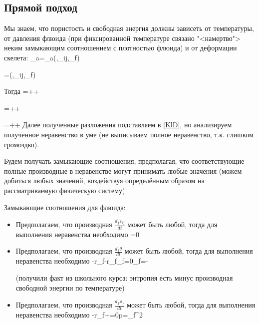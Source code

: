 \documentclass[main.tex]{subfiles}
\begin{document}
\subsection{Прямой подход}

Мы знаем, что пористость и свободная энергия должны зависеть от температуры, от давления флюида (при фиксированной температуре связано "<намертво"> неким замыкающим соотношением с плотностью флюида) и от деформации скелета:
\beq
\Psi_a=\Psi_a\left(\theta,\varepsilon_{ij},\rho_f\right)
\eeq

\beq
\varphi=\varphi\left(\theta,\varepsilon_{ij},\rho_f\right)
\eeq

Тогда
\beq
{}=++
\eeq

\beq
{}=++
\eeq

\beq
{}=\frac{\partial\varphi}{\partial\theta}++
\eeq
Далее полученные разложения подставляем в \eqref{KlD}, но анализируем полученное неравенство в уме (не выписываем полное неравенство, т.к. слишком громоздко).

Будем получать замыкающие соотношения, предполагая, что соответствующие полные производные в неравенстве могут принимать любые значения (можем добиться любых значений, воздействуя определённым образом на рассматриваемую физическую систему)

Замыкающие соотношения для флюида:

\begin{itemize}
\item Предполагаем, что производная $\displaystyle{}\frac{d_f\varepsilon_{ij}}{dt}$ может быть любой, тогда для выполнения неравенства необходимо
\beq\label{FirstFluid1}
=0
\eeq

\item Предполагаем, что производная $\displaystyle{}\frac{d_f\theta}{dt}$ может быть любой, тогда для выполнения неравенства необходимо 
\beq\label{FirstFluid2}
-r_f-r_f\eta_f=0\Rightarrow\eta_f=-
\eeq

(получили факт из школьного курса: энтропия есть минус производная свободной энергии по температуре)

\item Предполагаем, что производная $\displaystyle{}\frac{d_f\rho_f}{dt}$ может быть любой, тогда для выполнения неравенства необходимо 
\beq\label{FirstFluid3}
-r_f+=0\Rightarrow p=\rho_f^2
\eeq

\end{itemize}
\end{document}
